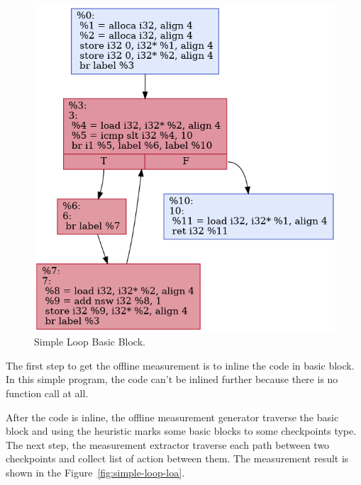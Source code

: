 \begin{figure}[htbp]
    \centerline{\includegraphics[scale=.75]{Figures/05/simple-loop.png}}
    \caption{Simple Loop Basic Block.} 
    \label{fig:simple-loop-bb}
\end{figure}

The first step to get the offline measurement is to inline the code in basic
block. In this simple program, the code can't be inlined further because there
is no function call at all. 

After the code is inline, the offline measurement generator traverse the basic
block and using the heuristic marks some basic blocks to some checkpoints type.
The next step, the measurement extractor traverse each path between two
checkpoints and collect list of action between them. The measurement result is
shown in the Figure~\ref{fig:simple-loop-loa}.

